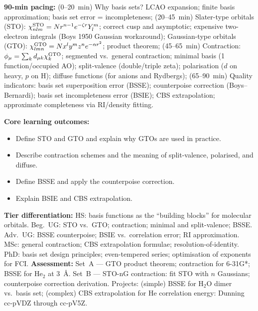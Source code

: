 \documentclass[11pt,a4paper]{article}
\begin{document}
\begin{tcolorbox}[chembox, title={Module~III.2 --- Lecture L13: Basis Sets I --- Types of Functions}]
\textbf{90-min pacing:} (0--20~min) Why basis sets? LCAO expansion; finite basis approximation; basis set error = incompleteness; (20--45~min) Slater-type orbitals (STO): $\chi^{\rm STO}_{nlm}=Nr^{n-1}e^{-\zeta r}Y_l^m$; correct cusp and asymptotic; expensive two-electron integrals (Boys 1950 Gaussian workaround); Gaussian-type orbitals (GTO): $\chi^{\rm GTO}_{lmn}=Nx^ly^mz^ne^{-\alpha r^2}$; product theorem; (45--65~min) Contraction: $\phi_\mu=\sum_k d_{\mu k}\chi_k^{\rm GTO}$; segmented vs.\ general contraction; minimal basis (1 function/occupied AO); split-valence (double/triple zeta); polarisation ($d$ on heavy, $p$ on H); diffuse functions (for anions and Rydbergs); (65--90~min) Quality indicators: basis set superposition error (BSSE); counterpoise correction (Boys--Bernardi); basis set incompleteness error (BSIE); CBS extrapolation; approximate completeness via RI/density fitting.

\medskip\textbf{Core learning outcomes:}
\begin{itemize}[leftmargin=1.4em,topsep=2pt,itemsep=1pt]
  \item Define STO and GTO and explain why GTOs are used in practice.
  \item Describe contraction schemes and the meaning of split-valence, polarised, and diffuse.
  \item Define BSSE and apply the counterpoise correction.
  \item Explain BSIE and CBS extrapolation.
\end{itemize}
\medskip\textbf{Tier differentiation:}
HS: basis functions as the ``building blocks'' for molecular orbitals.
Beg.\ UG: STO vs.\ GTO; contraction; minimal and split-valence; BSSE.
Adv.\ UG: BSSE counterpoise; BSIE vs.\ correlation error; RI approximation.
MSc: general contraction; CBS extrapolation formulae; resolution-of-identity.
PhD: basis set design principles; even-tempered series; optimisation of exponents for FCI.
\medskip\textbf{Assessment:}
Set~A --- GTO product theorem; contraction for 6-31G*; BSSE for He$_2$ at 3~\AA.
Set~B --- STO-nG contraction: fit STO with $n$ Gaussians; counterpoise correction derivation.
Projects: (simple) BSSE for H$_2$O dimer vs.\ basis set; (complex) CBS extrapolation for He correlation energy: Dunning cc-pVDZ through cc-pV5Z.
\end{tcolorbox}

\medskip
\end{document}
